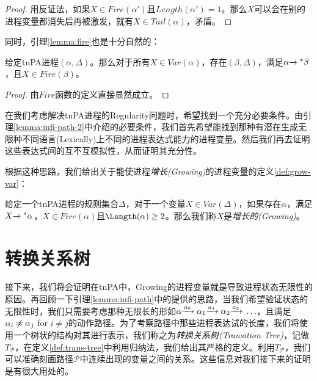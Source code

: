 \begin{proof}
用反证法，如果$X\in Fire(\alpha')$且$Length(\alpha')=1$。那么$X$可以会在别的进程变量都消失后再被激发，就有$X\in Tail(\alpha)$，矛盾。
\end{proof}

同时，引理\ref{lemma:fire}也是十分自然的：

\begin{lem}\label{lemma:fire}
给定tnPA进程$(\alpha,\Delta)$。那么对于所有$X\in Var(\alpha)$，存在$(\beta,\Delta)$，满足$\alpha{\xrightarrow{}{}}^{*}\beta$，且$X\in Fire(\beta)$。
\end{lem}

\begin{proof}
由$Fire$函数的定义直接显然成立。
\end{proof}

在我们考虑解决tnPA进程的Regularity问题时，希望找到一个充分必要条件。由引理\ref{lemma:infi-path-2}中介绍的必要条件，我们首先希望能找到那种有潜在生成无限种不同语言(Lexically)上不同的进程表达式能力的进程变量。然后我们再去证明这些表达式间的互不互模拟性，从而证明其充分性。

根据这种思路，我们给出关于能使进程\emph{增长(Growing)}的进程变量的定义\ref{def:grow-var}：

\begin{defn}\label{def:grow-var}
给定一个tnPA进程的规则集合$\Delta$，对于一个变量$X\in Var(\Delta)$，如果存在$\alpha$，满足$X{\xrightarrow{}{}}^{*}\alpha$，$X\in Fire(\alpha)$且$\Length(\alpha)\geq 2$。那么我们称$X$是\emph{增长的(Growing)}。
\end{defn}

\section{转换关系树}
\label{sec:trans-tree}

接下来，我们将会证明在tnPA中，Growing的进程变量就是导致进程状态无限性的原因。再回顾一下引理\ref{lemma:infi-path}中的提供的思路，当我们希望验证状态的无限性时，我们只需要考虑那种无限长的形如$\alpha{\xrightarrow{a_0}{}}\alpha_1{\xrightarrow{a_1}{}}\alpha_2{\xrightarrow{a_2}{}}\ldots$，且满足$\alpha_i\not\approx \alpha_j$ for $i\neq j$的动作路径。为了考察路径中那些进程表达试的长度，我们将使用一个树状的结构对其进行表示，我们称之为\emph{转换关系树(Transition Tree)}，记做$T_{\mathcal{P}}$，在定义\ref{def:trans-tree}中利用归纳法，我们给出其严格的定义。利用$T_{\mathcal{P}}$，我们可以准确刻画路径$\mathcal{P}$中连续出现的变量之间的关系。这些信息对我们接下来的证明是有很大用处的。

